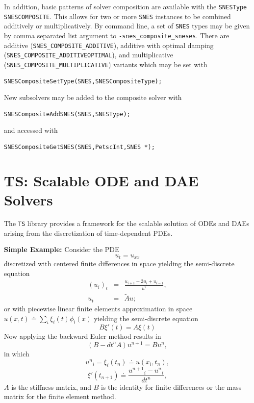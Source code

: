 In addition, basic patterns of solver composition are available with the \lstinline{SNESType} \lstinline{SNESCOMPOSITE}.  This allows for two or
more \lstinline{SNES} instances to be combined additively or multiplicatively.  By command line, a set of \lstinline{SNES} types may be given by
comma separated list argument to \break\lstinline{-snes_composite_sneses}.  There are additive (\lstinline{SNES_COMPOSITE_ADDITIVE}),
additive with optimal damping \break(\lstinline{SNES_COMPOSITE_ADDITIVEOPTIMAL}), and multiplicative
(\lstinline{SNES_COMPOSITE_MULTIPLICATIVE}) variants which may be set with
\begin{lstlisting}
SNESCompositeSetType(SNES,SNESCompositeType);
\end{lstlisting}
New subsolvers may be added to the composite solver with
\begin{lstlisting}
SNESCompositeAddSNES(SNES,SNESType);
\end{lstlisting}
and accessed with
\begin{lstlisting}
SNESCompositeGetSNES(SNES,PetscInt,SNES *);
\end{lstlisting}

\cleardoublepage
\chapter{TS: Scalable ODE and DAE Solvers}
\label{chapter_ts}

The \lstinline{TS} library provides a framework for the scalable solution of ODEs and DAEs
arising from the discretization of time-dependent PDEs.

\vspace{.2cm}

\noindent

{\bf Simple Example:} Consider the PDE
\[
          u_t = u_{xx}
\]
discretized with centered finite differences in space yielding  the  semi-discrete equation
\begin{eqnarray*}
          (u_i)_t & =  & \frac{u_{i+1} - 2 u_{i} + u_{i-1}}{h^2}, \\
           u_t      &  = & \tilde{A} u;
\end{eqnarray*}
or with piecewise linear finite elements approximation in space
$ u(x,t) \doteq \sum_i \xi_i(t) \phi_i(x)$ yielding the  semi-discrete equation
\[
          B {\xi}'(t) = A \xi(t)
\]
Now applying the backward Euler method results in
\[
        ( B - dt^n A  ) u^{n+1} = B u^n,
\]
in which
\[
         {u^n}_i = \xi_i(t_n) \doteq u(x_i,t_n),
\]
\[
         {\xi}'(t_{n+1}) \doteq \frac{{u^{n+1}}_i - {u^{n}}_i }{dt^{n}},
\]
$A$ is the stiffness matrix, and $B$ is the identity for finite differences or the mass matrix for the finite element method.

